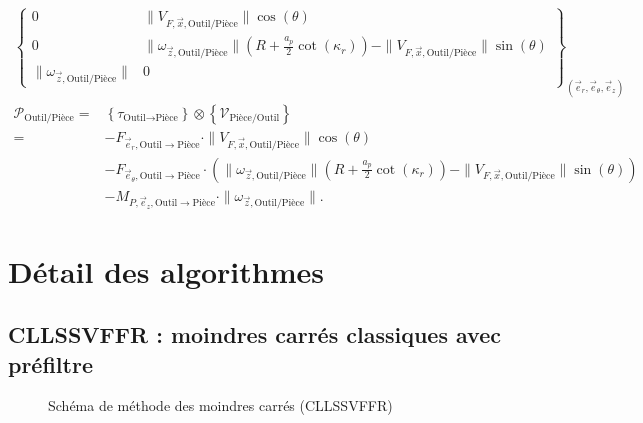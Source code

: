 \documentclass{style/presentation}
\begin{document}
\begin{frame}
\begin{align*}
{            \left\{
            \begin{array}{cc}
                0                                              & \|V_{F,\vec{x},\text{Outil}/\text{Pièce}}\|\cos(\theta)                                                                                             \\
                0                                              & \|\omega_{\vec{z},\text{Outil}/\text{Pièce}}\| \left(R+\frac{a_p}{2}\cot(\kappa_r)\right) - \|V_{F,\vec{x},\text{Outil}/\text{Pièce}}\|\sin(\theta) \\
                \|\omega_{\vec{z},\text{Outil}/\text{Pièce}}\| & 0
            \end{array}
            \right\}_{(\vec{e}_r,\vec{e}_\theta,\vec{e}_z)}}
    \end{align*}
    \begin{equation*}
        \begin{split}
            \mathcal{P}_{\text{Outil}/\text{Pièce}} = & \left\{\tau_{\text{Outil}\to\text{Pièce}}\right\} \otimes \left\{\mathcal{V}_{\text{Pièce}/\text{Outil}}\right\}                                                                                                        \\
            =                                         & -F_{\vec{e}_r,\text{Outil}\to\text{Pièce}} \cdot \|V_{F,\vec{x},\text{Outil}/\text{Pièce}}\|\cos(\theta)                                                                                                                \\
                                                      & - F_{\vec{e}_\theta,\text{Outil}\to\text{Pièce}} \cdot \left(\|\omega_{\vec{z},\text{Outil}/\text{Pièce}}\| \left(R+\frac{a_p}{2}\cot(\kappa_r)\right) - \|V_{F,\vec{x},\text{Outil}/\text{Pièce}}\|\sin(\theta)\right) \\
                                                      & - M_{P,\vec{e}_z,\text{Outil}\to\text{Pièce}} \cdot \|\omega_{\vec{z},\text{Outil}/\text{Pièce}}\|.
        \end{split}
    \end{equation*}
\end{frame}

\section{Détail des algorithmes}

\subsection{CLLSSVFFR : moindres carrés classiques avec préfiltre}
\begin{frame}
    \begin{figure}
        \centering
        \resizebox{!}{.9\textheight}{}
        \caption{Schéma de méthode des moindres carrés (CLLSSVFFR)}
    \end{figure}
\end{frame}
\end{document}
